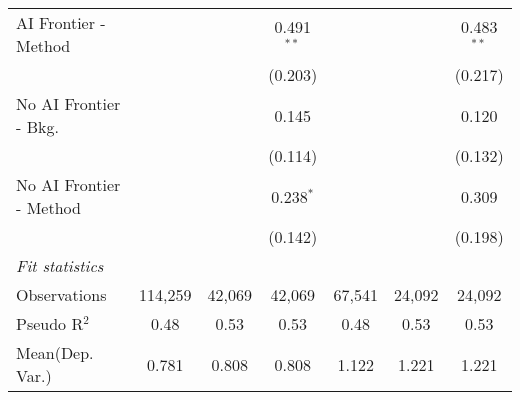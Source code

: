 \begin{tabular}{lcccccc}
   AI Frontier - Method    &               &               & 0.491$^{**}$  &               &              & 0.483$^{**}$\\   
                           &               &               & (0.203)       &               &              & (0.217)\\   
   No AI Frontier - Bkg.   &               &               & 0.145         &               &              & 0.120\\   
                           &               &               & (0.114)       &               &              & (0.132)\\   
   No AI Frontier - Method &               &               & 0.238$^{*}$   &               &              & 0.309\\   
                           &               &               & (0.142)       &               &              & (0.198)\\   
   \midrule
   \emph{Fit statistics}\\
   Observations            & 114,259       & 42,069        & 42,069        & 67,541        & 24,092       & 24,092\\  
   Pseudo R$^2$            & 0.48          & 0.53          & 0.53          & 0.48          & 0.53         & 0.53\\  
Mean(Dep. Var.) & 0.781 & 0.808 & 0.808 & 1.122 & 1.221 & 1.221 \\
   

\end{tabular}
